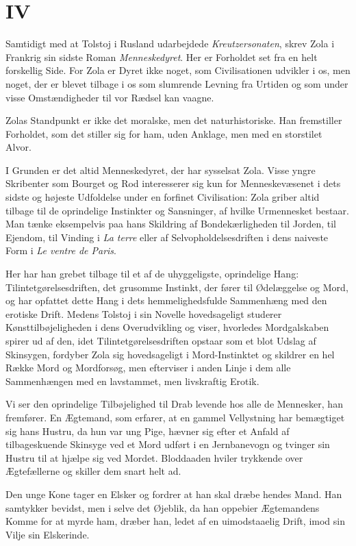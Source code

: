 \documentclass[12pt,a4paper]{article}
\begin{document}
\section*{IV}

Samtidigt med at Tolstoj i Rusland udarbejdede \textit{Kreutzersonaten},
skrev Zola i Frankrig sin sidste Roman \textit{Menneskedyret}. Her er
Forholdet set fra en helt forskellig Side. For Zola er Dyret ikke noget,
som Civilisationen udvikler i os, men noget, der er blevet tilbage i os
som slumrende Levning fra Urtiden og som under visse Omstændigheder til
vor Rædsel kan vaagne.

Zolas Standpunkt er ikke det moralske, men det naturhistoriske. Han
fremstiller Forholdet, som det stiller sig for ham, uden Anklage, men med
en storstilet Alvor.

I Grunden er det altid Menneskedyret, der har sysselsat Zola. Visse
yngre Skribenter som Bourget og Rod interesserer sig kun for
Menneskevæsenet i dets sidste og højeste Udfoldelse under en forfinet
Civilisation: Zola griber altid tilbage til de oprindelige Instinkter og
Sansninger, af hvilke Urmennesket bestaar. Man tænke eksempelvis paa hans
Skildring af Bondekærligheden til Jorden, til Ejendom, til Vinding i
\textit{La terre} eller af Selvopholdelsesdriften i dens naiveste Form i
\textit{Le ventre de Paris}.

Her har han grebet tilbage til et af de uhyggeligste, oprindelige Hang:
Tilintetgørelsesdriften, det grusomme Instinkt, der fører til Ødelæggelse
og Mord, og har opfattet dette Hang i dets hemmelighedsfulde Sammenhæng
med den erotiske Drift. Medens Tolstoj i sin Novelle hovedsageligt
studerer Kønsttilbøjeligheden i dens Overudvikling og viser, hvorledes
Mordgalskaben spirer ud af den, idet Tilintetgørelsesdriften opstaar som
et blot Udslag af Skinsygen, fordyber Zola sig hovedsageligt i
Mord-Instinktet og skildrer en hel Række Mord og Mordforsøg, men
efterviser i anden Linje i dem alle Sammenhængen med en lavstammet, men
livskraftig Erotik.

Vi ser den oprindelige Tilbøjelighed til Drab levende hos alle de
Mennesker, han fremfører. En Ægtemand, som erfarer, at en gammel
Vellystning har bemægtiget sig hans Hustru, da hun var ung Pige, hævner
sig efter et Anfald af tilbageskuende Skinsyge ved et Mord udført i en
Jernbanevogn og tvinger sin Hustru til at hjælpe sig ved Mordet.
Bloddaaden hviler trykkende over Ægtefællerne og skiller dem snart helt
ad.

Den unge Kone tager en Elsker og fordrer at han skal dræbe hendes Mand.
Han samtykker bevidst, men i selve det Øjeblik, da han oppebier
Ægtemandens Komme for at myrde ham, dræber han, ledet af en
uimodstaaelig Drift, imod sin Vilje sin Elskerinde.
\end{document}
